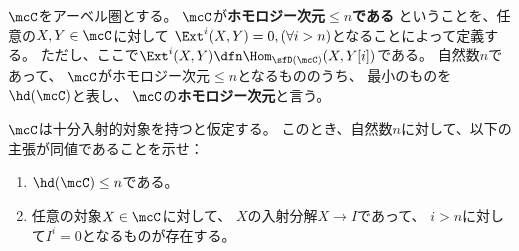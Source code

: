 \documentclass[uplatex,dvipdfmx]{jsarticle}
\begin{document}
\maketitle
\HeaderCommentA
\section{}
\fi


\begin{prob}\label{1.17}
  \(\mcC\)をアーベル圏とする。
  \(\mcC\)が\textbf{ホモロジー次元\(\leq n\)である}
  ということを、任意の\(X,Y\in \mcC\)に対して
  \(\Ext^i(X,Y) = 0 ,(\forall i > n)\)となることによって定義する。
  ただし、ここで\(\Ext^i(X,Y) \dfn \Hom_{\sfD(\mcC)}(X,Y[i])\)である。
  自然数\(n\)であって、
  \(\mcC\)がホモロジー次元\(\leq n\)となるもののうち、
  最小のものを\(\hd(\mcC)\)と表し、
  \(\mcC\)の\textbf{ホモロジー次元}と言う。

  \(\mcC\)は十分入射的対象を持つと仮定する。
  このとき、自然数\(n\)に対して、以下の主張が同値であることを示せ：
  \begin{enumerate}
    \item \label{1.17.1}
    \(\hd(\mcC) \leq n\)である。
    \item \label{1.17.2}
    任意の対象\(X\in \mcC\)に対して、
    \(X\)の入射分解\(X\to I\)であって、
    \(i > n\)に対して\(I^i = 0\)となるものが存在する。
  \end{enumerate}
\end{prob}
\end{document}
